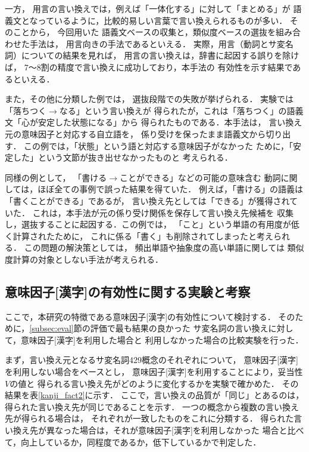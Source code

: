 一方，
用言の言い換えでは，例えば「一体化する」に対して「まとめる」が
語義文となっているように，比較的易しい言葉で言い換えられるものが多い．
そのことから，
今回用いた
語義文ベースの収集と，類似度ベースの選抜を組み合わせた手法は，
用言向きの手法であるといえる．
実際，用言（動詞とサ変名詞）についての結果を見れば，
用言の言い換えは，辞書に起因する誤りを除けば，
7〜8割の精度で言い換えに成功しており，本手法の
有効性を示す結果であるといえる．

また，その他に分類した例では，
選抜段階での失敗が挙げられる．
実験では「落ちつく$\rightarrow$なる」という言い換えが
得られたが，これは「落ちつく」の語義文「心が安定した状態になる」から
得られたものである．本手法は，
言い換え元の意味因子と対応する自立語を，
係り受けを保ったまま語義文から切り出す．
この例では，「状態」という語と対応する意味因子がなかった
ために，「安定した」という文節が抜き出せなかったものと
考えられる．

同様の例として，
「書ける$\rightarrow$ことができる」などの可能の意味含む
動詞に関しては，ほぼ全ての事例で誤った結果を得ていた．
  例えば，「書ける」の語義は「書くことができる」であるが，
  言い換え先としては「できる」が獲得されていた．
  これは，本手法が元の係り受け関係を保存して言い換え先候補を
  収集し，選抜することに起因する．この例では，
  「こと」という単語の有用度が低く計算されたために，
  これに係る「書く」も削除されてしまったと考えられる．
  この問題の解決策としては，
  頻出単語や抽象度の高い単語に関しては
  類似度計算の対象としない手法が考えられる．

\subsection{意味因子[漢字]の有効性に関する実験と考察}
ここで，本研究の特徴である意味因子[漢字]の有効性について検討する．
そのために，\ref{subsec:eval}節の評価で最も結果の良かった
サ変名詞の言い換えに対して，意味因子[漢字]を利用した場合と
利用しなかった場合の比較実験を行った．

まず，言い換え元となるサ変名詞429概念のそれぞれについて，
意味因子[漢字]を利用しない場合をベースとし，
意味因子[漢字]を利用することにより，妥当性$V$の値と
得られる言い換え先がどのように変化するかを実験で確かめた．
その結果を表\ref{kanji_fact2}に示す．
ここで，言い換えの品質が「同じ」とあるのは，
得られた言い換え先が同じであることを示す．
一つの概念から複数の言い換え先が得られる場合は，
それぞれが一致したものをこれに分類する．
得られた言い換え先が異なった場合は，それが意味因子[漢字]を利用しなかった
場合と比べて，向上しているか，同程度であるか，低下しているかで判定した．

